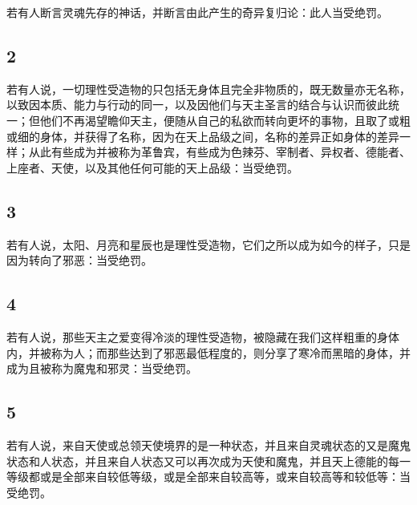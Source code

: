 若有人断言灵魂先存的神话，并断言由此产生的奇异复归论：此人当受绝罚。\par


\subsection{2}

若有人说，一切理性受造物的只包括无身体且完全非物质的，既无数量亦无名称，以致因本质、能力与行动的同一，以及因他们与天主圣言的结合与认识而彼此统一；但他们不再渴望瞻仰天主，便随从自己的私欲而转向更坏的事物，且取了或粗或细的身体，并获得了名称，因为在天上品级之间，名称的差异正如身体的差异一样；从此有些成为并被称为革鲁宾，有些成为色辣芬、宰制者、异权者、德能者、上座者、天使，以及其他任何可能的天上品级：当受绝罚。\par


\subsection{3}

若有人说，太阳、月亮和星辰也是理性受造物，它们之所以成为如今的样子，只是因为转向了邪恶：当受绝罚。\par


\subsection{4}

若有人说，那些天主之爱变得冷淡的理性受造物，被隐藏在我们这样粗重的身体内，并被称为人；而那些达到了邪恶最低程度的，则分享了寒冷而黑暗的身体，并成为且被称为魔鬼和邪灵：当受绝罚。\par


\subsection{5}

若有人说，来自天使或总领天使境界的是一种状态，并且来自灵魂状态的又是魔鬼状态和人状态，并且来自人状态又可以再次成为天使和魔鬼，并且天上德能的每一等级都或是全部来自较低等级，或是全部来自较高等，或来自较高等和较低等：当受绝罚。\par

